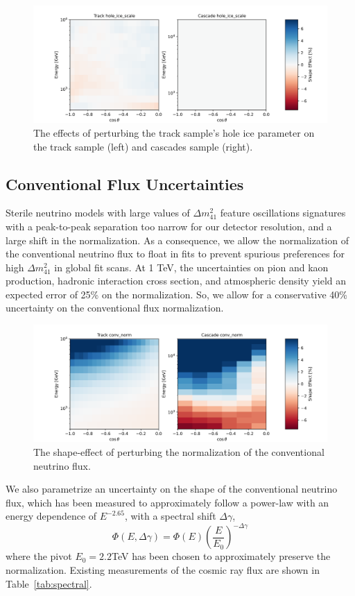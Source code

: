 \documentclass[main.tex]{subfiles}
\begin{document}
\begin{figure}
    \centering
    \includegraphics[width=0.8\linewidth]{figures/systematics/hole_ice_scale.png}
    \caption{The effects of perturbing the track sample's hole ice parameter on the track sample (left) and cascades sample (right).}\label{fig:track_hole}
\end{figure}

\subsection{Conventional Flux Uncertainties}\label{sec:barr_hg}
Sterile neutrino models with large values of $\Delta m_{41}^{2}$ feature oscillations signatures with a peak-to-peak separation too narrow for our detector resolution, and a large shift in the normalization. 
As a consequence, we allow the normalization of the conventional neutrino flux to float in fits to prevent spurious preferences for high $\Delta m_{41}^{2}$ in global fit scans. 
At 1 TeV, the uncertainties on pion and kaon production, hadronic interaction cross section, and atmospheric density yield an expected error of 25\% on the normalization\cite{Aartsen_2020_prd}. 
So, we allow for a conservative 40\% uncertainty on the conventional flux normalization.

\begin{figure}
    \centering
    \includegraphics[width=0.8\linewidth]{figures/systematics/conv_norm.png}
    \caption{The shape-effect of perturbing the normalization of the conventional neutrino flux.}
\end{figure}


We also parametrize an uncertainty on the shape of the conventional neutrino flux, which has been measured to approximately follow a power-law with an energy dependence of $E^{-2.65}$, with a spectral shift $\Delta \gamma$,
\begin{equation}
\Phi(E, \Delta \gamma) = \Phi(E)\left(\dfrac{E}{E_{0}}\right)^{-\Delta\gamma}
\end{equation}
where the pivot $E_{0}=2.2$TeV has been chosen to approximately preserve the normalization. 
Existing measurements of the cosmic ray flux are shown in Table~\ref{tab:spectral}. 
\end{document}
